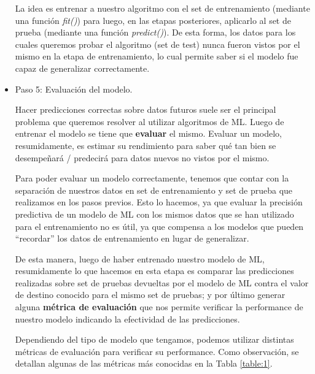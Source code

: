 \documentclass[12pt,a4paper]{article}
\begin{document}
\begin{sloppypar}
\begin{itemize}
La idea es entrenar a nuestro algoritmo con el set de entrenamiento (mediante una función \textit{fit()}) para luego, en las etapas posteriores, aplicarlo al set de prueba (mediante una función \textit{predict()}). De esta forma, los datos para los cuales queremos probar el algoritmo (set de test) nunca fueron vistos por el mismo en la etapa de entrenamiento, lo cual permite saber si el modelo fue capaz de generalizar correctamente.\\

\item Paso 5: Evaluación del modelo\cite{apunte_uba}.

Hacer predicciones correctas sobre datos futuros suele ser el principal problema que queremos resolver al utilizar algoritmos de ML. Luego de entrenar el modelo se tiene que \textbf{evaluar} el mismo. Evaluar un modelo, resumidamente, es estimar su rendimiento para saber qué tan bien se desempeñará / predecirá para datos nuevos no vistos por el mismo.

Para poder evaluar un modelo correctamente, tenemos que contar con la separación de nuestros datos en set de entrenamiento y set de prueba que realizamos en los pasos previos. Esto lo hacemos, ya que evaluar la precisión predictiva de un modelo de ML con los mismos datos que se han utilizado para el entrenamiento no es útil, ya que compensa a los modelos que pueden ``recordar'' los datos de entrenamiento en lugar de generalizar.

De esta manera, luego de haber entrenado nuestro modelo de ML, resumidamente lo que hacemos en esta etapa es comparar las predicciones realizadas sobre set de pruebas devueltas por el modelo de ML contra el valor de destino conocido para el mismo set de pruebas; y por último generar alguna \textbf{métrica de evaluación} que nos permite verificar la performance de nuestro modelo indicando la efectividad de las predicciones.

Dependiendo del tipo de modelo que tengamos, podemos utilizar distintas métricas de evaluación para verificar su performance. Como observación, se detallan algunas de las métricas más conocidas en la Tabla \ref{table:1}. \\


\end{itemize}
\end{sloppypar}
\end{document}
